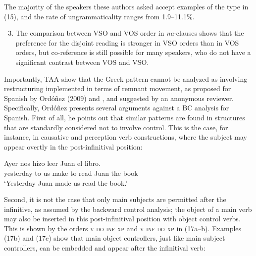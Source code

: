 \documentclass[output=paper]{langsci/langscibook}
\begin{document}
The majority of the speakers these authors asked accept examples of the type in (15), and the rate of ungrammaticality ranges from 1.9--11.1\%.  

\begin{enumerate}\setcounter{enumi}{2}
\item The comparison between VSO and VOS order in \textit{na}{}-clauses shows that the preference for the disjoint reading is stronger in VSO orders than in VOS orders, but co-reference is still possible for many speakers, who do not have a significant contrast between VOS and VSO. 
\end{enumerate}

Importantly, TAA show that the Greek pattern cannot be analyzed as involving restructuring implemented in terms of remnant movement, as proposed for Spanish by Ordóñez (2009) and \citet{Herbeck2013}, and suggested by an anonymous reviewer. Specifically, Ordóñez presents several arguments against a BC analysis for Spanish. First of all, he points out that similar patterns are found in structures that are standardly considered not to involve control. This is the case, for instance, in causative and perception verb constructions, where the subject may appear overtly in the post-infinitival position:

\ea%
    \label{ex:alexiadou:16}
    \gll Ayer     nos   hizo   leer   Juan   el libro.  \\
           yesterday   to us   make   to read Juan   the book  \\
    \glt   ‘Yesterday Juan made us read the book.’  
    \z

           

Second, it is not the case that only main subjects are permitted after the infinitive, as assumed by the backward control analysis; the object of a main verb may also be inserted in this post-infinitival position with object control verbs. This is shown by the orders \textsc{v do inf xp} and \textsc{v inf do xp} in (17a--b). Examples (17b) and (17c) show that main object controllers, just like main subject controllers, can be embedded and appear after the infinitival verb:

\ea%
    \label{ex:alexiadou:17}
    \z
\z    
\end{document}
